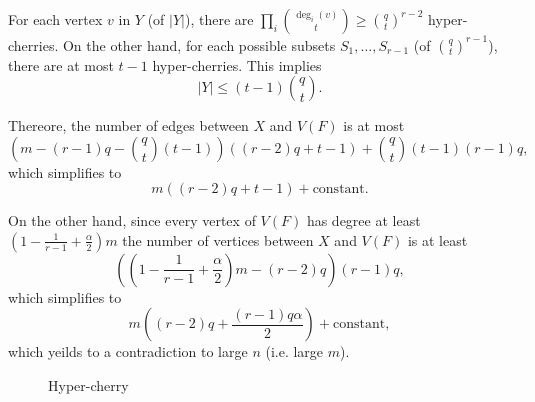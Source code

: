 \begin{sk}
	For each vertex $v$ in $Y$ (of $|Y|$), there are $\prod_{i} \binom{\deg_i(v)}{t} \ge \binom{q}{t}^{r-2}$ hyper-cherries. On the other hand, for each possible subsets $S_1, \dots, S_{r-1}$ (of $\binom{q}{t}^{r-1}$), there are at most $t-1$ hyper-cherries. This implies \[
		|Y| \le (t-1)\binom{q}{t}.
	\]

	Thereore, the number of edges between $X$ and $V(F)$ is at most \[
		\left(m - (r-1)q - \binom{q}{t}(t-1)\right) \left((r-2)q + t - 1\right) + \binom{q}{t}(t-1)(r-1)q,
	\]
	which simplifies to \[
		m ((r-2)q + t - 1) + \text{constant}.
	\]

	On the other hand, since every vertex of $V(F)$ has degree at least $\left(1 - \frac{1}{r-1} + \frac{\alpha}{2}\right)m$ the number of vertices between $X$ and $V(F)$ is at least \[
		\left(\left(1 - \frac{1}{r-1} + \frac{\alpha}{2}\right)m - (r-2)q\right)(r-1)q,
	\]
	which simplifies to \[
		m\left((r-2)q + \frac{(r-1)q\alpha}{2}\right) + \text{constant},
	\]
	which yeilds to a contradiction to large $n$ (i.e. large $m$).
\end{sk}

\begin{figure}[ht]
    \centering
    \caption{Hyper-cherry}
    \label{fig:erdos-stone-theorem}
\end{figure}

